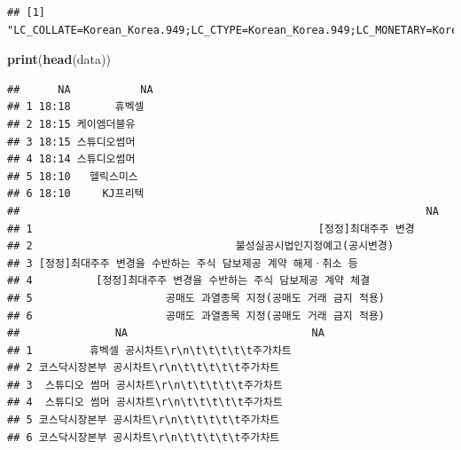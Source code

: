 \documentclass[]{book}
\newenvironment{Shaded}{\begin{snugshade}}{\end{snugshade}}
\newcommand{\DataTypeTok}[1]{\textcolor[rgb]{0.13,0.29,0.53}{#1}}
\newcommand{\DecValTok}[1]{\textcolor[rgb]{0.00,0.00,0.81}{#1}}
\newcommand{\KeywordTok}[1]{\textcolor[rgb]{0.13,0.29,0.53}{\textbf{#1}}}
\newcommand{\NormalTok}[1]{#1}
\newcommand{\OperatorTok}[1]{\textcolor[rgb]{0.81,0.36,0.00}{\textbf{#1}}}
\newcommand{\OtherTok}[1]{\textcolor[rgb]{0.56,0.35,0.01}{#1}}
\newcommand{\StringTok}[1]{\textcolor[rgb]{0.31,0.60,0.02}{#1}}
\begin{document}
\begin{Shaded}
\end{Shaded}

\begin{verbatim}
## [1] "LC_COLLATE=Korean_Korea.949;LC_CTYPE=Korean_Korea.949;LC_MONETARY=Korean_Korea.949;LC_NUMERIC=C;LC_TIME=Korean_Korea.949"
\end{verbatim}

\begin{Shaded}
\begin{Highlighting}[]
\KeywordTok{print}\NormalTok{(}\KeywordTok{head}\NormalTok{(data))}
\end{Highlighting}
\end{Shaded}

\begin{verbatim}
##      NA           NA
## 1 18:18       휴벡셀
## 2 18:15 케이엠더블유
## 3 18:15 스튜디오썸머
## 4 18:14 스튜디오썸머
## 5 18:10   헬릭스미스
## 6 18:10     KJ프리텍
##                                                                NA
## 1                                             [정정]최대주주 변경
## 2                                불성실공시법인지정예고(공시변경)
## 3 [정정]최대주주 변경을 수반하는 주식 담보제공 계약 해제ㆍ취소 등
## 4          [정정]최대주주 변경을 수반하는 주식 담보제공 계약 체결
## 5                     공매도 과열종목 지정(공매도 거래 금지 적용)
## 6                     공매도 과열종목 지정(공매도 거래 금지 적용)
##               NA                             NA
## 1         휴벡셀 공시차트\r\n\t\t\t\t\t주가차트
## 2 코스닥시장본부 공시차트\r\n\t\t\t\t\t주가차트
## 3  스튜디오 썸머 공시차트\r\n\t\t\t\t\t주가차트
## 4  스튜디오 썸머 공시차트\r\n\t\t\t\t\t주가차트
## 5 코스닥시장본부 공시차트\r\n\t\t\t\t\t주가차트
## 6 코스닥시장본부 공시차트\r\n\t\t\t\t\t주가차트
\end{verbatim}
\end{document}
